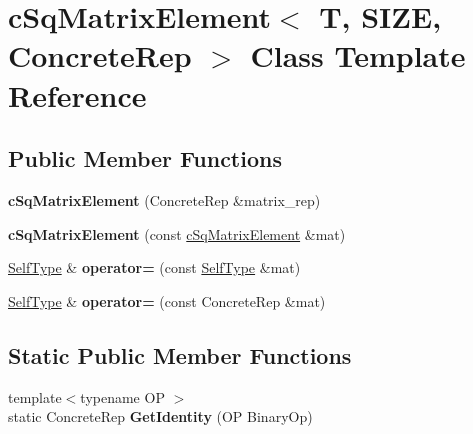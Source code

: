\hypertarget{classcSqMatrixElement}{\section{c\-Sq\-Matrix\-Element$<$ \-T, \-S\-I\-Z\-E, \-Concrete\-Rep $>$ \-Class \-Template \-Reference}
\label{classcSqMatrixElement}
}
\subsection*{\-Public \-Member \-Functions}
\begin{DoxyCompactItemize}
\item 
\hypertarget{classcSqMatrixElement_a615433d10518b5f93677bf412afaba8e}{{\bfseries c\-Sq\-Matrix\-Element} (\-Concrete\-Rep \&matrix\-\_\-rep)}\label{classcSqMatrixElement_a615433d10518b5f93677bf412afaba8e}

\item 
\hypertarget{classcSqMatrixElement_a9de33c865c25184ea239d640ab664b12}{{\bfseries c\-Sq\-Matrix\-Element} (const \hyperlink{classcSqMatrixElement}{c\-Sq\-Matrix\-Element} \&mat)}\label{classcSqMatrixElement_a9de33c865c25184ea239d640ab664b12}

\item 
\hypertarget{classcSqMatrixElement_a6e3b64d62a1b4be9c7cafc7e2968f5d8}{\hyperlink{classcSqMatrixElement}{\-Self\-Type} \& {\bfseries operator=} (const \hyperlink{classcSqMatrixElement}{\-Self\-Type} \&mat)}\label{classcSqMatrixElement_a6e3b64d62a1b4be9c7cafc7e2968f5d8}

\item 
\hypertarget{classcSqMatrixElement_a616ff5e2a9781d88aa48ecab0d99891e}{\hyperlink{classcSqMatrixElement}{\-Self\-Type} \& {\bfseries operator=} (const \-Concrete\-Rep \&mat)}\label{classcSqMatrixElement_a616ff5e2a9781d88aa48ecab0d99891e}

\end{DoxyCompactItemize}
\subsection*{\-Static \-Public \-Member \-Functions}
\begin{DoxyCompactItemize}
\item 
\hypertarget{classcSqMatrixElement_a45a21953fcc80438abc4b607fd57859f}{{\footnotesize template$<$typename O\-P $>$ }\\static \-Concrete\-Rep {\bfseries \-Get\-Identity} (\-O\-P \-Binary\-Op)}\label{classcSqMatrixElement_a45a21953fcc80438abc4b607fd57859f}

\end{DoxyCompactItemize}
